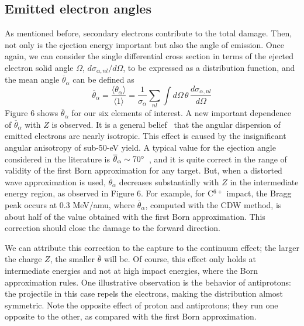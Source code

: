 \documentclass[preprint,12pt]{article}
\begin{document}
\subsection{Emitted electron angles}

As mentioned before, secondary electrons contribute to the total damage. 
Then, not only is the ejection energy important but also the angle 
of emission. Once again, we can consider the single differential cross 
section in terms of the ejected electron solid angle $\Omega$, 
$d\sigma_{\alpha,nl}/d\Omega$, to be expressed as a distribution function, 
and the mean angle $\overline{\theta}_{\alpha}$ can be defined as
\begin{equation}
\overline{\theta}_{\alpha}=\frac{\langle\theta_{\alpha}\rangle}
{\langle 1\rangle}=\frac{1}{\sigma_{\alpha}}\sum\limits_{nl}
\int d\Omega\,\theta\,\frac{d\sigma_{\alpha,nl}}{d\Omega}
\end{equation}
Figure 6 shows $\overline{\theta}_{\alpha}$ for our six elements of 
interest. A new important dependence of $\overline{\theta}_{\alpha}$ 
with $Z$ is observed. It is a general belief~\cite{Rudd1992} that the 
angular dispersion of emitted electrons are nearly isotropic. This effect 
is caused by the insignificant angular anisotropy of sub-50-eV yield. 
A typical value for the ejection angle considered in the literature is 
$\overline{\theta}_{\alpha}\sim 70\degree$~\cite{surdutovic2018}, and 
it is quite correct in the range of validity of the first Born 
approximation for any target. But, when a distorted wave approximation 
is used, $\overline{\theta}_{\alpha}$ decreases substantially with $Z$ 
in the intermediate energy region, as observed in Figure 6. 
For example, for C$^{6+}$ impact, the Bragg peak occurs at 0.3 MeV/amu, 
where $\overline{\theta}_{\alpha}$, computed with the CDW method, is 
about half of the value obtained with the first Born approximation. 
This correction should close the damage to the forward direction.

We can attribute this correction to the capture to the continuum effect;
the larger the charge $Z$, the smaller $\overline{\theta}$ will be. Of 
course, this effect only holds at intermediate energies and not at high 
impact energies, where the Born approximation rules. One illustrative 
observation is the behavior of antiprotons: the projectile in this case 
repels the electrons, making the distribution almost symmetric. 
Note the opposite effect of proton and antiprotons; they run one 
opposite to the other, as compared with the first Born approximation.
\end{document}

